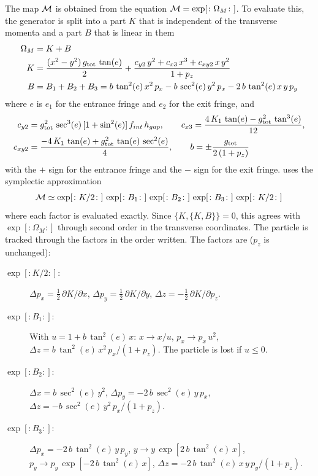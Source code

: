 The map $\cal M$ is obtained from the equation ${\cal M} = \exp[\colon\Omega_M\colon]$. To evaluate
this, the generator is split into a part $K$ that is independent of the transverse momenta and a part
$B$ that is linear in them
\begin{align}
  \Omega_M &= K + B \nonumber \\
  K &= \frac{(x^2 - y^2) \, g_{\text{tot}} \, \tan (e)}{2} 
    + \frac{c_{y2} \, y^2 + c_{x3} \, x^3 + c_{xy2} \, x \, y^2}{1 + p_z} \\
  B &= B_1 + B_2 + B_3 = b \, \tan^2 (e) \, x^2 \, p_x - b \, \sec^2 (e) \, y^2 \, p_x 
    - 2 \, b \, \tan^2 (e) \, x \, y \, p_y \nonumber
\end{align}
where $e$ is $e_1$ for the entrance fringe and $e_2$ for the exit fringe, and
\begin{align}
  c_{y2} &= g_{\text{tot}}^2 \, \sec^3 (e) \, [1 + \sin^2 (e)] \, f_{int} \, h_{gap}, \qquad
  c_{x3} = \frac{4 \, K_1 \, \tan (e) - g_{\text{tot}}^2 \, \tan^3 (e)}{12}, \nonumber \\
  c_{xy2} &= \frac{-4 \, K_1 \, \tan (e) + g_{\text{tot}}^2 \, \tan (e) \, \sec^2 (e)}{4}, \qquad
  b = \pm \frac{g_{\text{tot}}}{2 \, (1 + p_z)}
\end{align}
with the $+$ sign for the entrance fringe and the $-$ sign for the exit fringe.
\bmad uses the symplectic approximation
\begin{equation}
  {\cal M} \simeq \exp[\colon K/2 \colon] \, \exp[\colon B_1 \colon] \, \exp[\colon B_2 \colon] \, 
    \exp[\colon B_3 \colon] \, \exp[\colon K/2 \colon]
\end{equation}
where each factor is evaluated exactly. Since $\{K, \{K, B\}\} = 0$, this agrees with
$\exp[\colon\Omega_M\colon]$ through second order in the transverse coordinates. The particle is
tracked through the factors in the order written. The factors are ($p_z$ is unchanged):
\begin{description}
  \item[{$\exp[\colon K/2 \colon]$:}] $\Delta p_x = \frac{1}{2} \, \partial K / \partial x$, 
    $\Delta p_y = \frac{1}{2} \, \partial K / \partial y$, $\Delta z = -\frac{1}{2} \, \partial K / \partial p_z$.
  \item[{$\exp[\colon B_1 \colon]$:}] With $u = 1 + b \, \tan^2 (e) \, x$: 
    $x \rightarrow x / u$, $p_x \rightarrow p_x \, u^2$, 
    $\Delta z = b \, \tan^2 (e) \, x^2 \, p_x / (1 + p_z)$.
    The particle is lost if $u \le 0$.
  \item[{$\exp[\colon B_2 \colon]$:}] $\Delta x = b \, \sec^2 (e) \, y^2$, 
    $\Delta p_y = -2 \, b \, \sec^2 (e) \, y \, p_x$, 
    $\Delta z = -b \, \sec^2 (e) \, y^2 \, p_x / (1 + p_z)$.
  \item[{$\exp[\colon B_3 \colon]$:}] $\Delta p_x = -2 \, b \, \tan^2 (e) \, y \, p_y$,
    $y \rightarrow y \, \exp[2 \, b \, \tan^2 (e) \, x]$, $p_y \rightarrow p_y \, \exp[-2 \, b \, \tan^2 (e) \, x]$,
    $\Delta z = -2 \, b \, \tan^2 (e) \, x \, y \, p_y / (1 + p_z)$.
\end{description}
